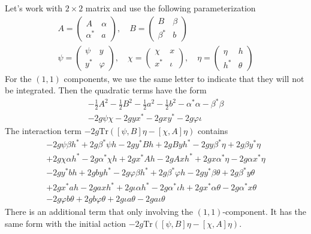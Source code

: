 Let's work with $2\times 2$ matrix and use the following parameterization
\begin{align*}
	A = \begin{pmatrix} A & \alpha \\ \alpha^* & a \end{pmatrix},\quad B = \begin{pmatrix} B & \beta \\ \beta^* & b \end{pmatrix} \\
	\psi = \begin{pmatrix} \psi & y \\ y^* & \varphi \end{pmatrix},\quad \chi = \begin{pmatrix} \chi & x \\ x^* & \iota \end{pmatrix} ,\quad \eta = \begin{pmatrix} \eta & h \\ h^* & \theta \end{pmatrix}
\end{align*}
For the $(1,1)$ components, we use the same letter to indicate that they will not be integrated.
Then the quadratic terms have the form
\begin{align*}
	- \frac{1}{2} A^2 - \frac{1}{2} B^2 - \frac{1}{2} a^2 - \frac{1}{2} b^2 - \alpha^* \alpha - \beta^* \beta \\
	- 2g \psi\chi - 2g y x^* - 2g x y^* - 2g \varphi \iota
\end{align*}
The interaction term $ -2 g \mathrm{Tr}([\psi,B]\eta - [\chi,A]\eta)$ contains
\begin{align*}
	-2 g \psi \beta h^* + 2 g \beta^* \psi h - 2g y^* B h + 2 g B y h^* - 2 g y \beta^* \eta + 2 g \beta y^* \eta \\
	+2 g \chi \alpha h^* - 2 g \alpha^* \chi h + 2g x^* A h - 2 g A x h^* + 2 g x \alpha^* \eta - 2 g \alpha x^* \eta \\
	-2 g y^* b h + 2 g b y h^* - 2g \varphi \beta h^* + 2g \beta^* \varphi h - 2g y^* \beta \theta + 2g \beta^* y \theta \\
	+2 g x^* a h - 2 g a x h^* + 2g \iota \alpha h^* - 2g \alpha^* \iota h + 2g x^* \alpha \theta - 2g \alpha^* x \theta \\
	- 2g \varphi b \theta + 2g b \varphi \theta + 2g \iota a \theta - 2g a \iota \theta
\end{align*}
There is an additional term that only involving the $(1,1)$-component.
It has the same form with the initial action $ -2 g \mathrm{Tr}([\psi,B]\eta - [\chi,A]\eta)$.

